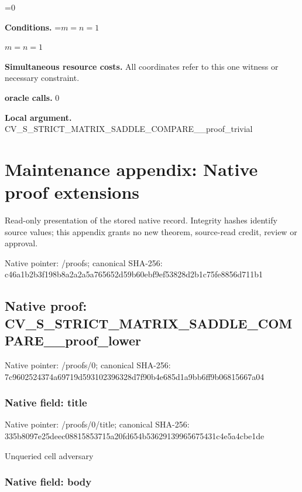 \documentclass[10pt,a4paper]{article}
\newcommand{\AtlasMath}[1]{\par\begingroup\centering\setbox0=\hbox{$\displaystyle #1$}\ifdim\wd0>1.4\linewidth\typeout{ATLAS WIDE FORMULA: \the\wd0}\fi\ifdim\wd0>\linewidth\resizebox{\linewidth}{!}{\box0}\else\box0\fi\par\endgroup}
\newcommand{\AtlasInlineMath}[1]{\begingroup\setbox0=\hbox{$#1$}\ifdim\wd0>.4\linewidth\endgroup\AtlasMath{#1}\else\endgroup$#1$\fi}
\begin{document}
\AtlasMath{0}


\textbf{Conditions.} \AtlasInlineMath{m=n=1}



\textbf{Simultaneous resource costs.} All coordinates refer to this one witness or necessary constraint.



\textbf{oracle calls.} 0



\textbf{Local argument.} CV\_S\_STRICT\_MATRIX\_SADDL\allowbreak{}E\_COMPARE\_\_proof\_trivial



\section{Maintenance appendix: Native proof extensions}


Read-only presentation of the stored native record. Integrity hashes identify source values; this appendix grants no new theorem, source-read credit, review or approval.



Native pointer: /proofs; canonical SHA-256: c46a1b2b3f198b8a2a2a5a76\allowbreak{}5652d59b60ebf9ef53828d2b\allowbreak{}1c75fe8856d711b1



\subsection{Native proof: CV\_S\_STRICT\_MATRIX\_SADDL\allowbreak{}E\_COMPARE\_\_proof\_lower}


Native pointer: /proofs/0; canonical SHA-256: 7c9602524374a69719d59310\allowbreak{}2396328d7f90b4e685d1a9bb\allowbreak{}6ff9b06815667a04



\subsubsection{Native field: title}


Native pointer: /proofs/0/title; canonical SHA-256: 335b8097e25deec088158537\allowbreak{}15a20fd654b5362913996567\allowbreak{}5431c4e5a4cbe1de


Unqueried cell adversary


\subsubsection{Native field: body}
\end{document}
